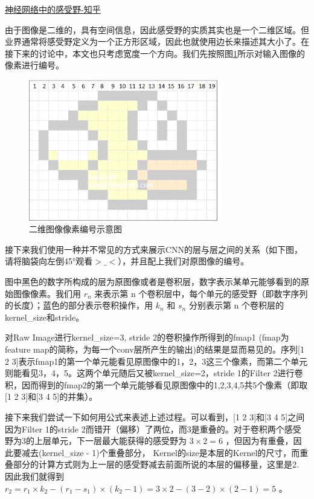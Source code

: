 \href{https://zhuanlan.zhihu.com/p/28492837}{神经网络中的感受野-知乎}

由于图像是二维的，具有空间信息，因此感受野的实质其实也是一个二维区域。但业界通常将感受野定义为一个正方形区域，因此也就使用边长来描述其大小了。在接下来的讨论中，本文也只考虑宽度一个方向。我们先按照图\ref{PerceptionField0}所示对输入图像的像素进行编号。

\begin{figure}[!hbtp]
\centering
\includegraphics[width=0.75\textwidth]{DLTips/PerceptionField0.jpg}
\caption{二维图像像素编号示意图}
\label{PerceptionField0}
\end{figure}

接下来我们使用一种并不常见的方式来展示CNN的层与层之间的关系（如下图，请将脑袋向左倒45°观看$>\_<$），并且配上我们对原图像的编号。

图中黑色的数字所构成的层为原图像或者是卷积层，数字表示某单元能够看到的原始图像像素。我们用 $r_n$ 来表示第 n 个卷积层中，每个单元的感受野（即数字序列的长度）；蓝色的部分表示卷积操作，用 $k_n$ 和 $s_n$ 分别表示第 n 个卷积层的kernel\_size和stride。

对Raw Image进行kernel\_size=3, stride 2的卷积操作所得到的fmap1 (fmap为feature map的简称，为每一个conv层所产生的输出)的结果是显而易见的。序列[1 2 3]表示fmap1的第一个单元能看见原图像中的1，2，3这三个像素，而第二个单元则能看见3，4，5。这两个单元随后又被kernel\_size=2，stride 1的Filter 2进行卷积，因而得到的fmap2的第一个单元能够看见原图像中的1,2,3,4,5共5个像素（即取[1 2 3]和[3 4 5]的并集）。

接下来我们尝试一下如何用公式来表述上述过程。可以看到，[1 2 3]和[3 4 5]之间因为Filter 1的stride 2而错开（偏移）了两位，而3是重叠的。对于卷积两个感受野为3的上层单元，下一层最大能获得的感受野为 $3\times2=6$ ，但因为有重叠，因此要减去(kernel\_size - 1)个重叠部分， Kernel的size是本层的Kernel的尺寸，而重叠部分的计算方式则为上一层的感受野减去前面所说的本层的偏移量，这里是2. 因此我们就得到 $r_2=r_1\times k_2-(r_1-s_1)\times(k_2-1)=3\times2-(3-2)\times(2-1)=5$ 。

